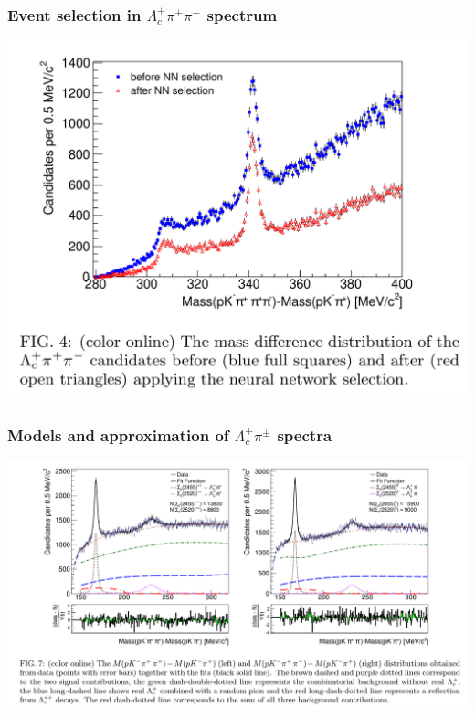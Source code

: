 \documentclass[10pt]{beamer}
\begin{document}
\begin{frame}[label=selection-Lc*]%
  \frametitle{Event selection in $\Lambda_c^+\pi^+\pi^-$ spectrum}
  \centering
  \includegraphics[width=.7\textwidth]{figures/001/selection-Lcstar}

\end{frame}%

\begin{frame}[label=fit-Sc*]%
  \frametitle{Models and approximation of $\Lambda_c^+\pi^\pm$ spectra}
  \centering
  \includegraphics[width=\textwidth]{figures/001/fit-Scstar}

\end{frame}%
\end{document}
